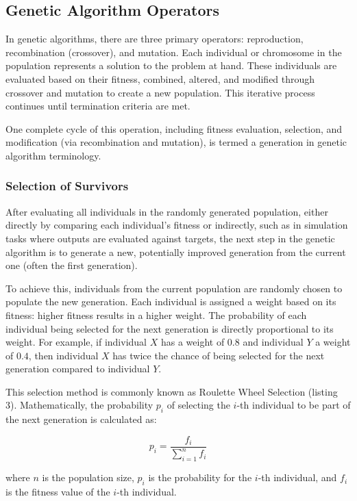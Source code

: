 \documentclass[12pt]{article}
\begin{document}
\subsection{Genetic Algorithm Operators}

In genetic algorithms, there are three primary operators: reproduction, recombination (crossover), and mutation. Each individual or chromosome in the population represents a solution to the problem at hand. These individuals are evaluated based on their fitness, combined, altered, and modified through crossover and mutation to create a new population. This iterative process continues until termination criteria are met.

One complete cycle of this operation, including fitness evaluation, selection, and modification (via recombination and mutation), is termed a generation in genetic algorithm terminology.


\subsubsection{Selection of Survivors}

After evaluating all individuals in the randomly generated population, either directly by comparing each individual's fitness or indirectly, such as in simulation tasks where outputs are evaluated against targets, the next step in the genetic algorithm is to generate a new, potentially improved generation from the current one (often the first generation).

To achieve this, individuals from the current population are randomly chosen to populate the new generation. Each individual is assigned a weight based on its fitness: higher fitness results in a higher weight. The probability of each individual being selected for the next generation is directly proportional to its weight. For example, if individual $X$ has a weight of $0.8$ and individual $Y$ a weight of $0.4$, then individual $X$ has twice the chance of being selected for the next generation compared to individual $Y$.

This selection method is commonly known as Roulette Wheel Selection (listing 3). Mathematically, the probability $p_i$ of selecting the $i$-th individual to be part of the next generation is calculated as:

$$p_{i} = \frac{f_i}{\sum_{i=1}^{n}f_i}$$


where $n$ is the population size, $p_i$ is the probability for the $i$-th individual, and $f_i$ is the fitness value of the $i$-th individual.
\end{document}
